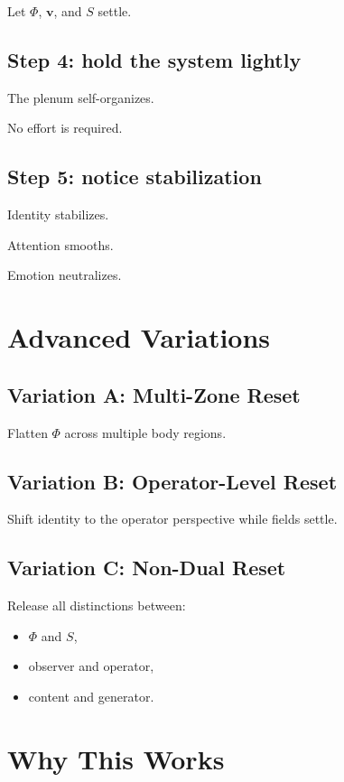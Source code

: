 \documentclass[12pt]{article}
\begin{document}
Let $\Phi$, $\mathbf{v}$, and $S$ settle.

\subsection*{Step 4: hold the system lightly}

The plenum self-organizes.

No effort is required.

\subsection*{Step 5: notice stabilization}

Identity stabilizes.

Attention smooths.

Emotion neutralizes.

\section{Advanced Variations}

\subsection{Variation A: Multi-Zone Reset}

Flatten $\Phi$ across multiple body regions.

\subsection{Variation B: Operator-Level Reset}

Shift identity to the operator perspective while fields settle.

\subsection{Variation C: Non-Dual Reset}

Release all distinctions between:

\begin{itemize}
    \item $\Phi$ and $S$,
    \item observer and operator,
    \item content and generator.
\end{itemize}

\section{Why This Works}
\end{document}
